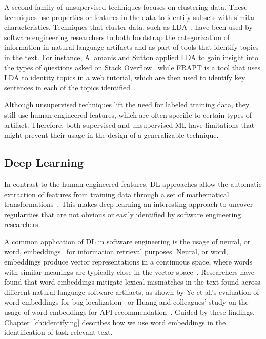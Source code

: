 A second family of unsupervised techniques focuses on clustering data.
These techniques use properties or features in the data to 
identify 
subsets with similar characteristics. 
Techniques that cluster data, such as \acf{LDA}~\cite{blei2003latent},
have been used by software engineering researchers to both 
bootstrap the categorization of information in 
natural language artifacts and as part of tools that identify topics in the text. 
For instance, Allamanis and Sutton
applied \acs{LDA}
to gain insight into the types of questions 
asked on Stack Overflow~\cite{Allamanis2013}
while FRAPT is a tool that 
uses \acs{LDA} to identity topics in a web tutorial,
which are then used to identify
key sentences in each of the topics identified~\cite{Jiang2017}.



Although unsupervised techniques lift the need for labeled training data,
they still use human-engineered features, 
which are often specific to certain 
types of artifact. Therefore, 
both supervised and unsupervised \acs{ML}
have limitations that might prevent their usage 
in the design of a generalizable technique.




\subsection{Deep Learning }
\label{cp2:deep-learning}



In contrast to the human-engineered features,
\acf{DL} approaches allow the automatic extraction of features 
from training data through a set of mathematical transformations~\cite{Deng2018, zhang2021deep}.
This makes 
deep learning an interesting 
approach to
uncover regularities 
that are not obvious or easily identified
by software engineering researchers.



A common application of \acs{DL} in software engineering is the usage of neural, or word, embeddings~\cite{Mikolov2013}
for information retrieval purposes. 
Neural, or word, embeddings produce vector representations in a continuous space,
where words with similar meanings are typically close in the vector space~\cite{harris1954distributional, mikolov2013efficient}. 
Researchers have found that word
embeddings mitigate lexical mismatches in the text found across different 
natural language software artifacts,
as shown by Ye et al.'s evaluation of word embeddings
for bug localization~\cite{Ye2016}
or Huang and colleagues' study on 
the usage of word embeddings for API recommendation~\cite{Huang2018}.
Guided by these findings, Chapter~\ref{ch:identifying} describes 
how we use word embeddings in the identification 
of task-relevant text.



